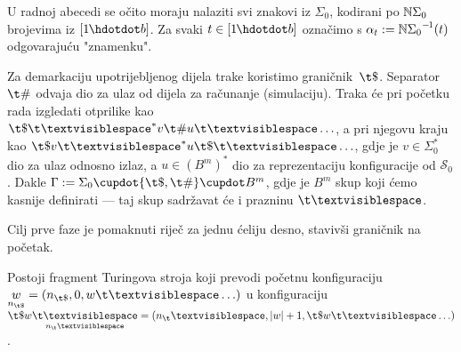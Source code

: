U radnoj abecedi se očito moraju nalaziti svi znakovi iz $\Sigma_0$, kodirani po ${\mathbb N}\Sigma_0$ brojevima iz $[1\mspace{-1mu}\dd b]$. Za svaki $t\in[1\mspace{-1mu}\dd b]$ označimo s $\alpha_t:={{\mathbb N}\Sigma_0}^{-\mspace{-2mu}1}(t)$ odgovarajuću "znamenku".  %

Za demarkaciju upotrijebljenog dijela trake koristimo graničnik~$\t\$$. Separator~$\t\#$ odvaja dio za ulaz od dijela za računanje (simulaciju). Traka će pri početku rada izgledati otprilike kao $\t\$\bl^*v\t\#u\bl\ldots$, a pri njegovu kraju kao $\t\$v\bl^*u\t\$\bl\ldots$, gdje je $v\in\Sigma_0^*$ dio za ulaz odnosno izlaz, a $u\in(B^m)^*$ dio za reprezentaciju konfiguracije od $\mathcal S_0$. Dakle
    $\Gamma:=\Sigma_0\dcup\{\t\$,\t\#\}\dcup B^m$,
gdje je $B^m$ skup koji ćemo kasnije definirati --- taj skup sadržavat će i prazninu $\bl$.


Cilj prve faze je pomaknuti riječ za jednu ćeliju desno, stavivši graničnik na početak. %

\begin{lema}[{name=[prvi fragment transpiliranog stroja]}]\label{lm:faza1}
	Postoji fragment Turingova stroja koji prevodi početnu konfiguraciju\\ $\underset{n_{\t\$}}{w}=(n_{\t\$},0,w\bl\ldots)$ u konfiguraciju $\t\$w\underset{\mathclap{n_\bl}}{\bl}=(n_\bl,\dulj{w}+1,\t\$w\bl\ldots)$.
\vspace{-6pt}
\end{lema}

